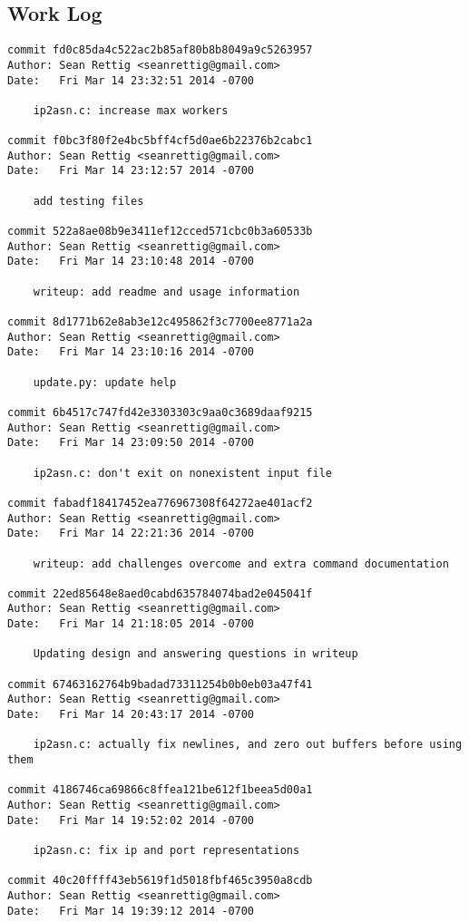 \documentclass[letterpaper,10pt,fleqn]{article}
\numberwithin{equation}{section}
\begin{document}
\subsection*{Work Log}
\begin{verbatim}
commit fd0c85da4c522ac2b85af80b8b8049a9c5263957
Author: Sean Rettig <seanrettig@gmail.com>
Date:   Fri Mar 14 23:32:51 2014 -0700

    ip2asn.c: increase max workers

commit f0bc3f80f2e4bc5bff4cf5d0ae6b22376b2cabc1
Author: Sean Rettig <seanrettig@gmail.com>
Date:   Fri Mar 14 23:12:57 2014 -0700

    add testing files

commit 522a8ae08b9e3411ef12cced571cbc0b3a60533b
Author: Sean Rettig <seanrettig@gmail.com>
Date:   Fri Mar 14 23:10:48 2014 -0700

    writeup: add readme and usage information

commit 8d1771b62e8ab3e12c495862f3c7700ee8771a2a
Author: Sean Rettig <seanrettig@gmail.com>
Date:   Fri Mar 14 23:10:16 2014 -0700

    update.py: update help

commit 6b4517c747fd42e3303303c9aa0c3689daaf9215
Author: Sean Rettig <seanrettig@gmail.com>
Date:   Fri Mar 14 23:09:50 2014 -0700

    ip2asn.c: don't exit on nonexistent input file

commit fabadf18417452ea776967308f64272ae401acf2
Author: Sean Rettig <seanrettig@gmail.com>
Date:   Fri Mar 14 22:21:36 2014 -0700

    writeup: add challenges overcome and extra command documentation

commit 22ed85648e8aed0cabd635784074bad2e045041f
Author: Sean Rettig <seanrettig@gmail.com>
Date:   Fri Mar 14 21:18:05 2014 -0700

    Updating design and answering questions in writeup

commit 67463162764b9badad73311254b0b0eb03a47f41
Author: Sean Rettig <seanrettig@gmail.com>
Date:   Fri Mar 14 20:43:17 2014 -0700

    ip2asn.c: actually fix newlines, and zero out buffers before using them

commit 4186746ca69866c8ffea121be612f1beea5d00a1
Author: Sean Rettig <seanrettig@gmail.com>
Date:   Fri Mar 14 19:52:02 2014 -0700

    ip2asn.c: fix ip and port representations

commit 40c20ffff43eb5619f1d5018fbf465c3950a8cdb
Author: Sean Rettig <seanrettig@gmail.com>
Date:   Fri Mar 14 19:39:12 2014 -0700


\end{verbatim}
\end{document}
